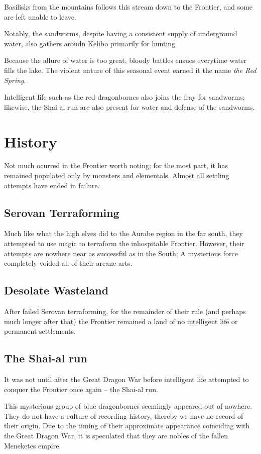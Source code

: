 \documentclass[../main.tex]{subfiles}
\begin{document}
Basilisks from the mountains follows this stream down to the Frontier,
and some are left unable to leave.

Notably, the sandworms, despite having a consistent supply of underground
water, also gathers aroudn Kelibo primarily for hunting.

Because the allure of water is too great, bloody battles ensues everytime
water fills the lake. The violent nature of this seasonal event earned it
the name \emph{the Red Spring}.

Intelligent life such as the red dragonbornes also joins the fray for
sandworms; likewise, the Shai-al run are also present for water and
defense of the sandworms.

\section{History}
Not much ocurred in the Frontier worth noting; for the most part, it has
remained populated only by monsters and elementals. Almost all settling
attempts have ended in failure.

\subsection{Serovan Terraforming}
Much like what the high elves did to the Aurabe region in the far south,
they attempted to use magic to terraform the inhospitable Frontier.
However, their attempts are nowhere near as successful as in the South;
A mysterious force completely voided all of their arcane arts.

\subsection{Desolate Wasteland}
After failed Serovan terraforming, for the remainder of their rule
(and perhaps much longer after that) the Frontier remained a land
of no intelligent life or permanent settlements.

\subsection{The Shai-al run}
It was not until after the Great Dragon War before intelligent
life attempted to conquer the Frontier once again -- the Shai-al run.

This mysterious group of blue dragonbornes seemingly appeared
out of nowhere. They do not have a culture of recording history,
thereby we have no record of their origin. Due to the timing
of their approximate appearance coinciding with the Great Dragon
War, it is speculated that they are nobles of the fallen Meneketes
empire.
\end{document}
